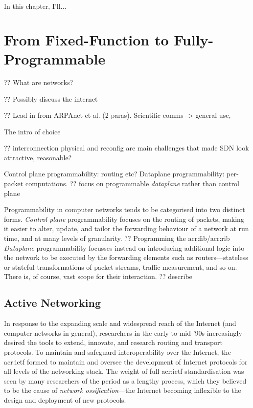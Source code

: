 In this chapter, I'll...
\section{From Fixed-Function to Fully-Programmable}

?? What are networks?

?? Possibly discuss the internet

?? Lead in from ARPAnet et al. (2 paras). Scientific comms -> general use,

The intro of choice~\parencite{DBLP:journals/ccr/FeamsterRZ14}

?? interconnection physical and reconfig are main challenges that made SDN look attractive, reasonable?

Control plane programmability: routing etc? Dataplane programmability: per-packet computations.
?? focus on programmable \emph{dataplane} rather than control plane

Programmability in computer networks tends to be categorised into two distinct forms.
\emph{Control plane} programmability focuses on the routing of packets, making it easier to alter, update, and tailor the forwarding behaviour of a network at run time, and at many levels of granularity.
?? Programming the \gls{acr:fib}/\gls{acr:rib}
\emph{Dataplane} programmability focusses instead on introducing additional logic into the network to be executed by the forwarding elements such as routers---stateless or stateful transformations of packet streams, traffic measurement, and so on.
There is, of course, vast scope for their interaction. ?? describe

\subsection{Active Networking}
In response to the expanding scale and widespread reach of the Internet (and computer networks in general), researchers in the early-to-mid '90s increasingly desired the tools to extend, innovate, and research routing and transport protocols.
To maintain and safeguard interoperability over the Internet, the \gls{acr:ietf} formed to maintain and oversee the development of Internet protocols for all levels of the networking stack.
The weight of full \gls{acr:ietf} standardisation was seen by many researchers of the period as a lengthy process, which they believed to be the cause of \emph{network ossification}---the Internet becoming inflexible to the design and deployment of new protocols.

